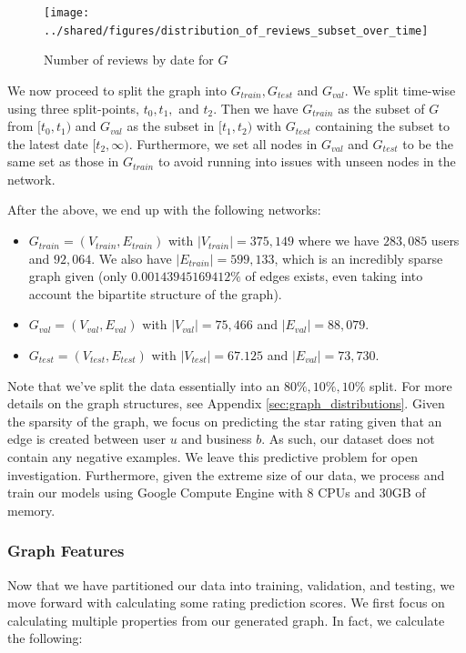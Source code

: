 \documentclass[letterpaper, 10 pt, conference]{ieeeconf}  %
\begin{document}
\begin{figure}[h!]
\centering
\texttt{[image: ../shared/figures/distribution\_of\_reviews\_subset\_over\_time]}
\caption{Number of reviews by date for $G$}
\label{fig:reviews_subset_over_time}
\end{figure}

We now proceed to split the graph into $G_{train}, G_{test}$ and $G_{val}$. We split time-wise using three split-points, $t_0, t_1,$ and $t_2$. Then we have $G_{train}$ as the subset of $G$ from $[t_0, t_1)$ and $G_{val}$ as the subset in $[t_1, t_2)$ with $G_{test}$ containing the subset to the latest date $[t_2, \infty)$. Furthermore, we set all nodes in $G_{val}$ and $G_{test}$ to be the same set as those in $G_{train}$ to avoid running into issues with unseen nodes in the network.

After the above, we end up with the following networks:
\begin{itemize}
\item $G_{train} = (V_{train}, E_{train})$ with $|V_{train}| = 375,149$ where we have $283,085$ users and $92,064$. We also have $|E_{train}| = 599,133$, which is an incredibly sparse graph given (only $0.00143945169412\%$ of edges exists, even taking into account the bipartite structure of the graph).
\item $G_{val} = (V_{val}, E_{val})$ with $|V_{val}| = 75,466$ and $|E_{val}| = 88,079$.
\item $G_{test} = (V_{test}, E_{test})$ with $|V_{test}| = 67.125$ and $|E_{val}| = 73,730$.
\end{itemize}

Note that we've split the data essentially into an $80\%, 10\%, 10\%$ split. For more details on the graph structures, see Appendix \ref{sec:graph_distributions}. Given the sparsity of the graph, we focus on predicting the star rating given that an edge is created between user $u$ and business $b$. As such, our dataset does not contain any negative examples. We leave this predictive problem for open investigation. Furthermore, given the extreme size of our data, we process and train our models using Google Compute Engine with 8 CPUs and 30GB of memory.

\subsubsection{Graph Features}
Now that we have partitioned our data into training, validation, and testing, we move forward with calculating some rating prediction scores. We first focus on calculating multiple properties from our generated graph. In fact, we calculate the following:
\end{document}
